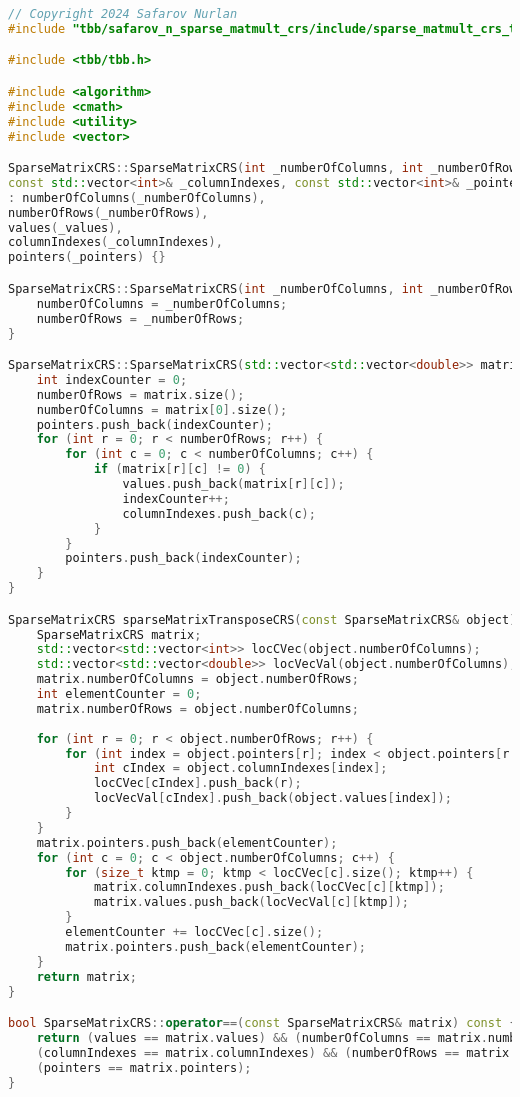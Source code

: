 \documentclass[a4paper, 14pt]{article}
\theoremstyle{plain}
\begin{document}
\begin{lstlisting}[language=C++,caption=Файл sparse\_matmult\_crs\_tbb.cpp]
// Copyright 2024 Safarov Nurlan
#include "tbb/safarov_n_sparse_matmult_crs/include/sparse_matmult_crs_tbb.hpp"

#include <tbb/tbb.h>

#include <algorithm>
#include <cmath>
#include <utility>
#include <vector>

SparseMatrixCRS::SparseMatrixCRS(int _numberOfColumns, int _numberOfRows, const std::vector<double>& _values,
const std::vector<int>& _columnIndexes, const std::vector<int>& _pointers)
: numberOfColumns(_numberOfColumns),
numberOfRows(_numberOfRows),
values(_values),
columnIndexes(_columnIndexes),
pointers(_pointers) {}

SparseMatrixCRS::SparseMatrixCRS(int _numberOfColumns, int _numberOfRows) {
	numberOfColumns = _numberOfColumns;
	numberOfRows = _numberOfRows;
}

SparseMatrixCRS::SparseMatrixCRS(std::vector<std::vector<double>> matrix) {
	int indexCounter = 0;
	numberOfRows = matrix.size();
	numberOfColumns = matrix[0].size();
	pointers.push_back(indexCounter);
	for (int r = 0; r < numberOfRows; r++) {
		for (int c = 0; c < numberOfColumns; c++) {
			if (matrix[r][c] != 0) {
				values.push_back(matrix[r][c]);
				indexCounter++;
				columnIndexes.push_back(c);
			}
		}
		pointers.push_back(indexCounter);
	}
}

SparseMatrixCRS sparseMatrixTransposeCRS(const SparseMatrixCRS& object) {
	SparseMatrixCRS matrix;
	std::vector<std::vector<int>> locCVec(object.numberOfColumns);
	std::vector<std::vector<double>> locVecVal(object.numberOfColumns);
	matrix.numberOfColumns = object.numberOfRows;
	int elementCounter = 0;
	matrix.numberOfRows = object.numberOfColumns;
	
	for (int r = 0; r < object.numberOfRows; r++) {
		for (int index = object.pointers[r]; index < object.pointers[r + 1]; index++) {
			int cIndex = object.columnIndexes[index];
			locCVec[cIndex].push_back(r);
			locVecVal[cIndex].push_back(object.values[index]);
		}
	}
	matrix.pointers.push_back(elementCounter);
	for (int c = 0; c < object.numberOfColumns; c++) {
		for (size_t ktmp = 0; ktmp < locCVec[c].size(); ktmp++) {
			matrix.columnIndexes.push_back(locCVec[c][ktmp]);
			matrix.values.push_back(locVecVal[c][ktmp]);
		}
		elementCounter += locCVec[c].size();
		matrix.pointers.push_back(elementCounter);
	}
	return matrix;
}

bool SparseMatrixCRS::operator==(const SparseMatrixCRS& matrix) const {
	return (values == matrix.values) && (numberOfColumns == matrix.numberOfColumns) &&
	(columnIndexes == matrix.columnIndexes) && (numberOfRows == matrix.numberOfRows) &&
	(pointers == matrix.pointers);
}


\end{lstlisting}
\end{document}
